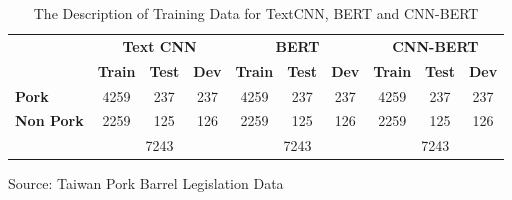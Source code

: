 \begin{table}[thb!]\centering
    \begin{threeparttable}
    \def\sym#1{\ifmmode^{#1}\else\(^{#1}\)\fi}
    \caption{The Description of Training Data for TextCNN, BERT and CNN-BERT}
        \begin{tabular}{l*{9}{c}}
        \toprule
        
                        & \multicolumn{3}{c}{\textbf{Text CNN}} 
                        & \multicolumn{3}{c}{\textbf{BERT}} 
                        & \multicolumn{3}{c}{\textbf{CNN-BERT}} \\
                        & \multicolumn{1}{c}{\textbf{Train} }
                        & \multicolumn{1}{c}{\textbf{Test}} 
                        & \multicolumn{1}{c}{\textbf{Dev} }
                        & \multicolumn{1}{c}{\textbf{Train}} 
                        & \multicolumn{1}{c}{\textbf{Test} }
                        & \multicolumn{1}{c}{\textbf{Dev}}
                        & \multicolumn{1}{c}{\textbf{Train}} 
                        & \multicolumn{1}{c}{\textbf{Test} }
                        & \multicolumn{1}{c}{\textbf{Dev}}\\
                                                
        \midrule
        \textbf{Pork}           & 4259 & 237 & 237  &  4259 & 237 & 237  & 4259 &  237 & 237 \\
        \textbf{Non Pork}       & 2259 & 125 & 126  &  2259 & 125 & 126  & 2259 &  125 & 126 \\
        
        \midrule
                       & \multicolumn{3}{c}{7243}   
                       & \multicolumn{3}{c}{7243}   
                       & \multicolumn{3}{c}{7243}    \\
         \midrule
        \end{tabular}
        \label{tab:traindata}
        \begin{tablenotes}
        Source: Taiwan Pork Barrel Legislation Data \citep{Luor2008, Luor2009, Luor2012}
        \end{tablenotes}
    \end{threeparttable}
\end{table}
